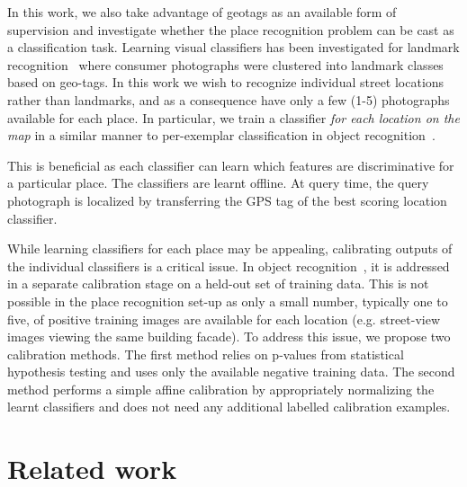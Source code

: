   In this work, we also take advantage of geotags as an available form of supervision and investigate whether the place recognition problem can be cast as a classification task.
 \textcolor{petr}{
    Learning visual classifiers has been investigated for landmark recognition~\cite{Li09} where consumer photographs were clustered into landmark classes based on geo-tags. 
  In this work we wish to recognize individual street locations rather than landmarks, and as a consequence have only a few (1-5) photographs available for each place.  In particular, we train a classifier {\em for each location on the map} in a similar manner to per-exemplar classification in object recognition~\cite{Malisiewicz11}. 
}


  This is beneficial as  each classifier can learn which features are discriminative for a particular place. %
   The classifiers are learnt offline. At query time, the query photograph is localized by transferring the GPS tag of the best scoring location classifier.

  While learning classifiers for each place may be appealing, calibrating outputs of the individual classifiers is a critical issue. In object recognition~\cite{Malisiewicz11}, it is addressed in a separate calibration stage on a held-out set of training data.
  This is not possible in the place recognition set-up as only a small number, typically one to five, of positive training images are available for each location (e.g. street-view images viewing the same building facade). To address this issue, we propose two calibration methods. 
  The first method relies on p-values from statistical hypothesis testing and uses only the available negative training data. The second method performs a simple affine calibration by appropriately normalizing the learnt classifiers and does not need any additional labelled calibration examples.   


\section{Related work} 
\label{sec:related}

